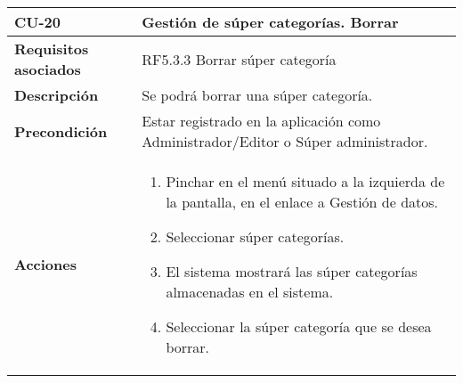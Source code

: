 \newpage
\begin{longtable}[H]{@{}ll@{}}
\toprule
\begin{minipage}[b]{0.23\columnwidth}\raggedright\strut
\textbf{CU-20}\strut
\end{minipage} & \begin{minipage}[b]{0.71\columnwidth}\raggedright\strut
\textbf{Gestión de súper categorías. Borrar}\strut
\end{minipage}\tabularnewline
\midrule
\endhead
\begin{minipage}[t]{0.23\columnwidth}\raggedright\strut
\textbf{Requisitos asociados}\strut
\end{minipage} & \begin{minipage}[t]{0.71\columnwidth}\raggedright\strut
RF5.3.3 Borrar súper categoría\strut
\end{minipage}\tabularnewline
\begin{minipage}[t]{0.23\columnwidth}\raggedright\strut
\textbf{Descripción}\strut
\end{minipage} & \begin{minipage}[t]{0.71\columnwidth}\raggedright\strut
Se podrá borrar una súper categoría.
\strut
\end{minipage}\tabularnewline
\begin{minipage}[t]{0.23\columnwidth}\raggedright\strut
\textbf{Precondición}\strut
\end{minipage} & \begin{minipage}[t]{0.71\columnwidth}\raggedright\strut
Estar registrado en la aplicación como Administrador/Editor o Súper administrador.\strut
\end{minipage}\tabularnewline
\begin{minipage}[t]{0.23\columnwidth}\raggedright\strut
\textbf{Acciones}\strut
\end{minipage} & \begin{minipage}[t]{0.71\columnwidth}\raggedright\strut
\begin{enumerate}
\def\labelenumi{\arabic{enumi}.}
\tightlist
\item
Pinchar en el menú situado a la izquierda de la pantalla, en el
enlace a Gestión de datos.
\item
Seleccionar súper categorías.
\item
El sistema mostrará las súper categorías almacenadas en el sistema.
\item
Seleccionar la súper categoría que se desea borrar.
\end{enumerate}\strut
\end{minipage}\tabularnewline

\end{longtable}
